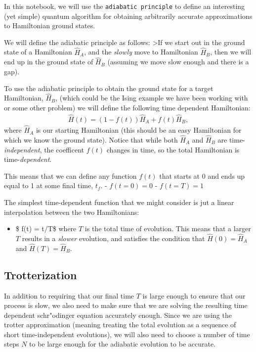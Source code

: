 \documentclass[11pt]{article}
\providecommand{\tightlist}{%
      \setlength{\itemsep}{0pt}\setlength{\parskip}{0pt}}
\begin{document}
In this notebook, we will use the \texttt{adiabatic\ principle} to
define an interesting (yet simple) quantum algorithm for obtaining
arbitrarily accurate approximations to Hamiltonian ground states.

We will define the adiabatic principle as follows: \textgreater If we
start out in the ground state of a Hamiltonian \(\hat{H}_A\), and the
\emph{slowly} move to Hamiltonian \(\hat{H}_B\), then we will end up in
the ground state of \(\hat{H}_B\) (assuming we move slow enough and
there is a gap).

To use the adiabatic principle to obtain the ground state for a target
Hamiltonian, \(\hat{H}_B\), (which could be the Ising example we have
been working with or some other problem) we will define the following
time dependent Hamiltonian: \[\begin{align}
\hat{H}(t) = (1-f(t)) \hat{H}_A + f(t) \hat{H}_B,
\end{align}\] where \(\hat{H}_A\) is our starting Hamiltonian (this
should be an easy Hamiltonian for which we know the ground state).
Notice that while both \(\hat{H}_A\) and \(\hat{H}_B\) are
time-\emph{independent}, the coefficent \(f(t)\) changes in time, so the
total Hamiltonian is time-\emph{dependent}.

This means that we can define any function \(f(t)\) that starts at 0 and
ends up equal to 1 at some final time, \(t_f\). - \(f(t=0) = 0\) -
\(f(t=T) = 1\)

The simplest time-dependent function that we might consider is jut a
linear interpolation between the two Hamiltonians:

\begin{itemize}
\tightlist
\item
  \$ f(t) = t/T\$ where \(T\) is the total time of evolution. This means
  that a larger \(T\) results in a \emph{slower} evolution, and
  satisfies the condition that \(\hat{H}(0)=\hat{H}_A\) and
  \(\hat{H}(T)=\hat{H}_B\).
\end{itemize}

\subsection{Trotterization}\label{trotterization}

In addition to requiring that our final time \(T\) is large enough to
ensure that our process is slow, we also need to make sure that we are
solving the resulting time dependent schr"odinger equation accurately
enough. Since we are using the trotter approximation (meaning treating
the total evolution as a sequence of short time-independent evolutions),
we will also need to choose a number of time steps \(N\) to be large
enough for the adiabatic evolution to be accurate.
\end{document}
